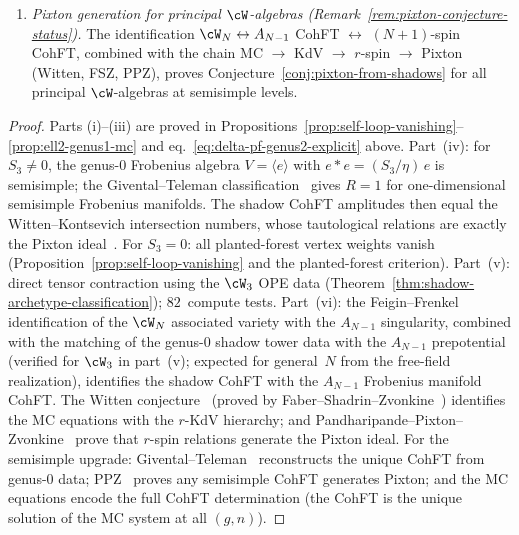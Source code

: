 \begin{theorem}
\begin{enumerate}[label=\textup{(\roman*)}]
  The $\cW_3$ CohFT is the $A_2$ Frobenius manifold CohFT with
  nontrivial $R$-matrix ($R_1 = -3\sqrt{6}/(8s^2)$ off-diagonal).
\item \emph{Pixton generation for principal $\cW$-algebras
  \textup{(}Remark~\textup{\ref{rem:pixton-conjecture-status}}\textup{)}.}
  The identification
  $\cW_N \leftrightarrow A_{N-1}$ CohFT
  $\leftrightarrow$ $(N{+}1)$-spin CohFT,
  combined with the chain
  MC $\to$ KdV $\to$ $r$-spin $\to$ Pixton
  \textup{(}Witten, FSZ, PPZ\textup{)},
  proves Conjecture~\textup{\ref{conj:pixton-from-shadows}} for all
  principal $\cW$-algebras at semisimple levels.
\end{enumerate}
\end{theorem}

\begin{proof}
Parts (i)--(iii) are proved in
Propositions~\ref{prop:self-loop-vanishing}--\ref{prop:ell2-genus1-mc}
and eq.~\eqref{eq:delta-pf-genus2-explicit} above.
Part~(iv): for $S_3 \neq 0$, the genus-$0$ Frobenius algebra
$V = \langle e \rangle$ with $e * e = (S_3/\eta)\,e$ is semisimple;
the Givental--Teleman classification~\cite{Givental01,Teleman12}
gives $R = 1$ for one-dimensional semisimple Frobenius manifolds.
The shadow CohFT amplitudes then equal the Witten--Kontsevich
intersection numbers, whose tautological relations are exactly
the Pixton ideal~\cite{PPZ19}.
For $S_3 = 0$: all planted-forest vertex weights vanish
(Proposition~\ref{prop:self-loop-vanishing} and the planted-forest
criterion).
Part~(v): direct tensor contraction using the $\cW_3$ OPE data
(Theorem~\ref{thm:shadow-archetype-classification});
$82$~compute tests.
Part~(vi): the Feigin--Frenkel identification of the $\cW_N$
associated variety with the $A_{N-1}$ singularity, combined with the
matching of the genus-$0$ shadow tower data with the $A_{N-1}$
prepotential (verified for $\cW_3$ in part~(v); expected for
general~$N$ from the free-field realization), identifies the shadow
CohFT with the $A_{N-1}$ Frobenius manifold CohFT.
The Witten conjecture~\cite{Witten93} (proved
by Faber--Shadrin--Zvonkine~\cite{FSZ10}) identifies the MC equations
with the $r$-KdV hierarchy; and
Pandharipande--Pixton--Zvonkine~\cite{PPZ19}
prove that $r$-spin relations generate the Pixton ideal.
For the semisimple upgrade: Givental--Teleman~\cite{Givental01,Teleman12}
reconstructs the unique CohFT from genus-$0$ data;
PPZ~\cite{PPZ19} proves any semisimple CohFT generates Pixton;
and the MC equations encode the full CohFT determination (the
CohFT is the unique solution of the MC system at all $(g,n)$).
\end{proof}

